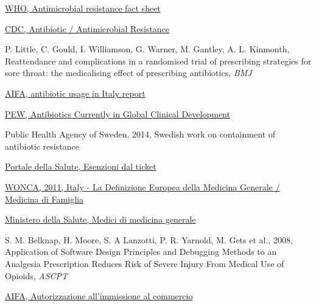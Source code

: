 \begin{thebibliography}{}
	\footnotesize
	
	\href{https://www.who.int/en/news-room/fact-sheets/detail/antimicrobial-resistance}{WHO, Antimicrobial resistance fact sheet}
	
	\href{https://www.cdc.gov/drugresistance/about.html}{CDC, Antibiotic / Antimicrobial Resistance}
	
	P. Little, C. Gould, I. Williamson, G. Warner, M. Gantley, A. L. Kinmonth, Reattendance and complications in a randomised trial of prescribing strategies for sore throat: the medicalising effect of prescribing antibiotics, \textit{BMJ}
	
	\href{http://www.aifa.gov.it/sites/default/files/Rapporto-L'uso\_degli\_antibiotici\_in\_Italia\_2017\_0.pdf}{AIFA, antibiotic usage in Italy report}
	
	\href{https://www.pewtrusts.org/en/research-and-analysis/data-visualizations/2014/antibiotics-currently-in-clinical-development}{PEW, Antibiotics Currently in Global Clinical Development}
	
	Public Health Agency of Sweden, 2014, Swedish work on containment of antibiotic resistance
	
	\href{http://www.salute.gov.it/portale/esenzioni/dettaglioContenutiEsenzioni.jsp?lingua=italiano\&id=4674\&area=esenzioni\&menu=vuoto}{Portale della Salute, Esenzioni dal ticket}
	
	\href{https://www.woncaeurope.org/sites/default/files/documents/Definizione\%20WONCA\%202011\%20ita_A4.pdf}{WONCA, 2011, Italy - La Definizione Europea della Medicina Generale / Medicina di Famiglia}
	
	\href{http://www.salute.gov.it/portale/temi/p2\_6.jsp?lingua=italiano\&id=1698\&area=tumori\&menu=percorso}{Ministero della Salute, Medici di medicina generale}
	
	S. M. Belknap, H. Moore, S. A Lanzotti, P. R. Yarnold, M. Gets et al., 2008, Application of Software Design Principles and Debugging Methods to an Analgesia Prescription Reduces Risk of Severe Injury From Medical Use of Opioids, \textit{ASCPT}
	
	\href{http://www.agenziafarmaco.gov.it/content/l\%E2\%80\%99autorizzazione-all\%E2\%80\%99immissione-commercio}{AIFA, Autorizzazione all'immissione al commercio}
	

\end{thebibliography}
